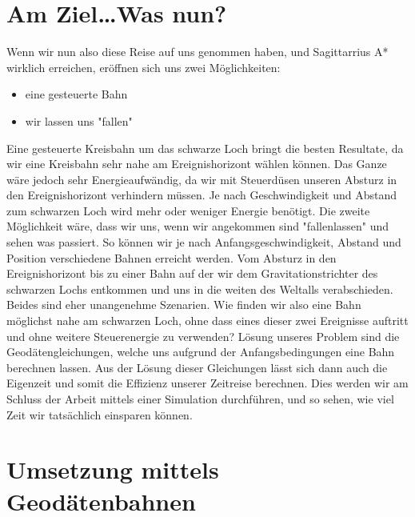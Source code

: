 \begin{refsection}
	\section{Am Ziel\dots Was nun?}
	
	Wenn wir nun also diese Reise auf uns genommen haben, und Sagittarrius A* wirklich erreichen, eröffnen sich uns zwei Möglichkeiten:
	\begin{itemize}
		\item eine gesteuerte Bahn
		\item wir lassen uns "fallen"
	\end{itemize}
	Eine gesteuerte Kreisbahn um das schwarze Loch bringt die besten Resultate, da wir eine Kreisbahn sehr nahe am Ereignishorizont wählen können. Das Ganze wäre jedoch sehr Energieaufwändig, da wir mit Steuerdüsen unseren Absturz in den Ereignishorizont verhindern müssen. Je nach Geschwindigkeit und Abstand zum schwarzen Loch wird mehr oder weniger Energie benötigt.
	Die zweite Möglichkeit wäre, dass wir uns, wenn wir angekommen sind "fallenlassen" und sehen was passiert. So können wir je nach Anfangsgeschwindigkeit, Abstand und Position verschiedene Bahnen erreicht werden. Vom Absturz in den Ereignishorizont bis zu einer Bahn auf der wir dem Gravitationstrichter des schwarzen Lochs entkommen und uns in die weiten des Weltalls verabschieden. Beides sind eher unangenehme Szenarien. 
	Wie finden wir also eine Bahn möglichst nahe am schwarzen Loch, ohne dass eines dieser zwei Ereignisse auftritt und ohne weitere Steuerenergie zu verwenden?
	Lösung unseres Problem sind die Geodätengleichungen, welche uns aufgrund der Anfangsbedingungen eine Bahn berechnen lassen. Aus der Lösung dieser Gleichungen lässt sich dann auch die Eigenzeit und somit die Effizienz unserer Zeitreise berechnen. Dies werden wir am Schluss der Arbeit mittels einer Simulation durchführen, und so sehen, wie viel Zeit wir tatsächlich einsparen können.
	
	\section{Umsetzung mittels Geodätenbahnen}
	

\end{refsection}
